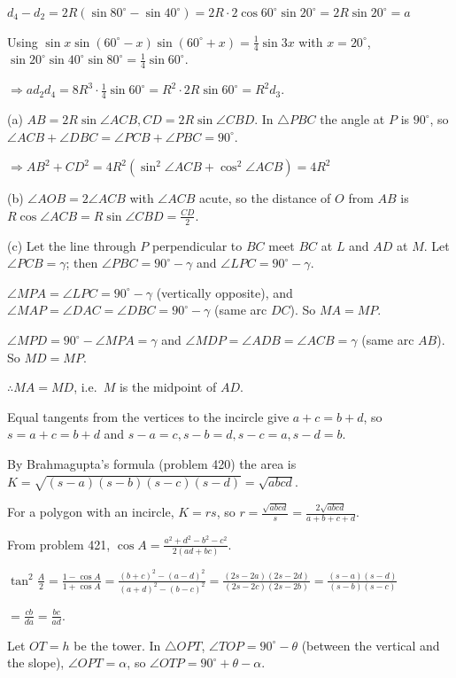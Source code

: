   $d_4 - d_2 = 2R(\sin80^\circ - \sin40^\circ) = 2R\cdot2\cos60^\circ\sin20^\circ = 2R\sin20^\circ = a$

  Using $\sin x\sin(60^\circ - x)\sin(60^\circ + x) = \frac{1}{4}\sin3x$ with $x = 20^\circ$,
  $\sin20^\circ\sin40^\circ\sin80^\circ = \frac{1}{4}\sin60^\circ$.

  $\Rightarrow ad_2d_4 = 8R^3\cdot\frac{1}{4}\sin60^\circ = R^2\cdot2R\sin60^\circ = R^2d_3$.
\item (a) $AB = 2R\sin\angle ACB, CD = 2R\sin\angle CBD$. In $\triangle PBC$ the angle at $P$ is $90^\circ$,
  so $\angle ACB + \angle DBC = \angle PCB + \angle PBC = 90^\circ$.

  $\Rightarrow AB^2 + CD^2 = 4R^2(\sin^2\angle ACB + \cos^2\angle ACB) = 4R^2$

  (b) $\angle AOB = 2\angle ACB$ with $\angle ACB$ acute, so the distance of $O$ from $AB$ is $R\cos\angle ACB
  = R\sin\angle CBD = \frac{CD}{2}$.

  (c) Let the line through $P$ perpendicular to $BC$ meet $BC$ at $L$ and $AD$ at $M$. Let $\angle PCB =
  \gamma$; then $\angle PBC = 90^\circ - \gamma$ and $\angle LPC = 90^\circ - \gamma$.

  $\angle MPA = \angle LPC = 90^\circ - \gamma$ (vertically opposite), and $\angle MAP = \angle DAC = \angle DBC
  = 90^\circ - \gamma$ (same arc $DC$). So $MA = MP$.

  $\angle MPD = 90^\circ - \angle MPA = \gamma$ and $\angle MDP = \angle ADB = \angle ACB = \gamma$ (same arc
  $AB$). So $MD = MP$.

  $\therefore MA = MD$, i.e.\ $M$ is the midpoint of $AD$.
\item Equal tangents from the vertices to the incircle give $a + c = b + d$, so $s = a + c = b + d$ and $s - a
  = c, s - b = d, s - c = a, s - d = b$.

  By Brahmagupta's formula (problem 420) the area is $K = \sqrt{(s - a)(s - b)(s - c)(s - d)} =
  \sqrt{abcd}$.

  For a polygon with an incircle, $K = rs$, so $r = \frac{\sqrt{abcd}}{s} = \frac{2\sqrt{abcd}}{a + b + c +
  d}$.

  From problem 421, $\cos A = \frac{a^2 + d^2 - b^2 - c^2}{2(ad + bc)}$.

  $\tan^2\frac{A}{2} = \frac{1 - \cos A}{1 + \cos A} = \frac{(b + c)^2 - (a - d)^2}{(a + d)^2 - (b - c)^2} =
  \frac{(2s - 2a)(2s - 2d)}{(2s - 2c)(2s - 2b)} = \frac{(s - a)(s - d)}{(s - b)(s - c)}$

  $= \frac{cb}{da} = \frac{bc}{ad}$.
\item Let $OT = h$ be the tower. In $\triangle OPT$, $\angle TOP = 90^\circ - \theta$ (between the vertical
  and the slope), $\angle OPT = \alpha$, so $\angle OTP = 90^\circ + \theta - \alpha$.

